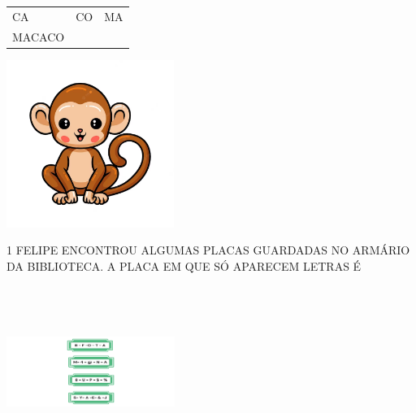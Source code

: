 \begin{longtable}[]{@{}lll@{}}
\toprule
CA & CO & MA\tabularnewline
MACACO\tabularnewline
\bottomrule
\end{longtable}

\includegraphics[width=2.14688in,height=2.14688in]{media/image81.png}







\num{1} FELIPE ENCONTROU ALGUMAS PLACAS GUARDADAS NO ARMÁRIO DA BIBLIOTECA. A
PLACA EM QUE SÓ APARECEM LETRAS É

\includegraphics[width=2.16042in,height=2.19514in]{media/image82.png}

